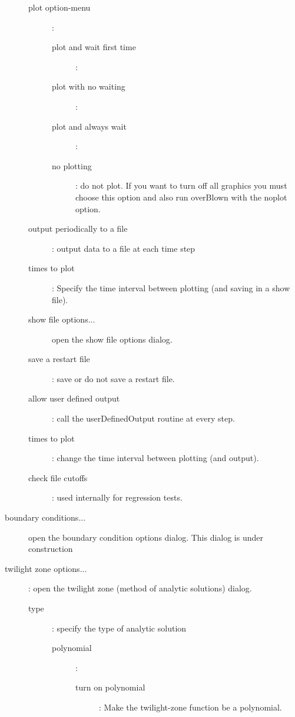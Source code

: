 \begin{description}
    \begin{description}
      \item[plot option-menu] :
        \begin{description}
          \item[plot and wait first time] :
          \item[plot with no waiting] :
          \item[plot and always wait] : 
          \item[no plotting] : do not plot. If you want to turn off all graphics you must choose
            this option and also run overBlown with the noplot option.
        \end{description}
      \item[output periodically to a file] : output data to a file at each time step
      \item[times to plot] : Specify the time interval between plotting (and saving in a show file).
      \item[show file options...] open the show file options dialog.
      \item[save a restart file] : save or do not save a restart file.
      \item[allow user defined output] : call the userDefinedOutput routine at every step.
      \item[times to plot] : change the time interval between plotting (and output).
      \item[check file cutoffs] : used internally for regression tests.
    \end{description}
 \item[boundary conditions...] open the boundary condition options dialog.
        This dialog is under construction
  \item[twilight zone options...] : open the twilight zone (method of analytic solutions) dialog.
    \begin{description}
     \item[type] : specify the type of analytic solution
     \begin{description}
       \item[polynomial] : 
         \begin{description}
           \item[turn on polynomial] : Make the twilight-zone function be a polynomial.

\end{description}
\end{description}
\end{description}
\end{description}
